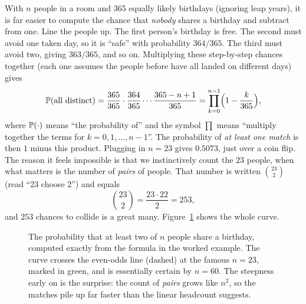 \begin{example}
With $n$ people in a room and $365$ equally likely birthdays (ignoring leap
years), it is far easier
to compute the chance that \emph{nobody} shares a birthday and subtract from one.
Line the people up. The first person's birthday is free. The second must avoid
one taken day, so it is ``safe'' with probability $364/365$. The third must avoid
two, giving $363/365$, and so on. Multiplying these step-by-step chances
together (each one assumes the people before have all landed on different days)
gives
\[
  \P(\text{all distinct})
  = \frac{365}{365}\cdot\frac{364}{365}\cdots\frac{365-n+1}{365}
  = \prod_{k=0}^{n-1}\Bigl(1-\frac{k}{365}\Bigr),
\]
where $\P(\cdot)$ means ``the probability of'' and the symbol $\prod$ means
``multiply together the terms for $k=0,1,\dots,n-1$''.
The probability of \emph{at least one match} is then $1$ minus this product.
Plugging in $n=23$ gives $0.5073$, just over a coin flip. The reason it feels
impossible is that we instinctively count the $23$ people, when what matters is
the number of \emph{pairs} of people. That number is written $\binom{23}{2}$
(read ``23 choose 2'') and equals
\[
  \binom{23}{2} = \frac{23\cdot 22}{2} = 253,
\]
and $253$ chances to collide is a great many. Figure~\ref{ch00:birthday} shows
the whole curve.
\end{example}

\begin{figure}[H]
\centering
{}
\caption{The probability that at least two of $n$ people share a birthday,
computed exactly from the formula in the worked example. The curve crosses the
even-odds line (dashed) at the famous $n=23$, marked in green, and is essentially
certain by $n=60$. The steepness early on is the surprise: the count of
\emph{pairs} grows like $n^2$, so the matches pile up far faster than the linear
headcount suggests.}
\label{ch00:birthday}
\end{figure}

